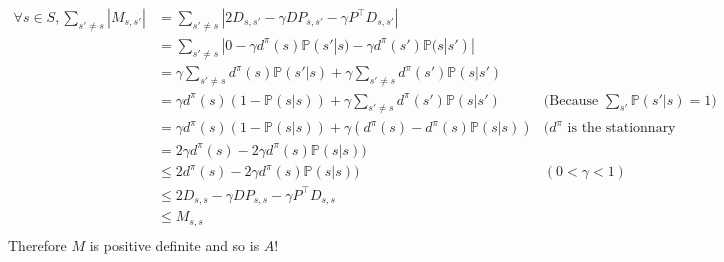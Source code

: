 \documentclass[a4paper]{article}
\newcommand{\transp}{\intercal}
\begin{document}
\begin{equation*}
    \begin{aligned}
        \forall s \in S, \sum_{s' \neq s} |M_{s, s'}| & = \sum_{s' \neq s} |2D_{s, s'} - \gamma DP_{s, s'} - \gamma P^\transp D_{s, s'}|                                                                             \\
                                                      & = \sum_{s' \neq s} |0 - \gamma d^\pi(s) \mathbb{P}(s'|s) - \gamma d^\pi(s') \mathbb{P}(s|s')|                                                                \\
                                                      & = \gamma \sum_{s' \neq s} d^\pi(s) \mathbb{P}(s'|s) + \gamma \sum_{s' \neq s} d^\pi(s') \mathbb{P}(s|s')                                                     \\
                                                      & = \gamma d^\pi(s) (1 - \mathbb{P}(s|s)) + \gamma \sum_{s' \neq s} d^\pi(s') \mathbb{P}(s|s')             & \text{(Because $\sum_{s'} \mathbb{P}(s'|s) = 1$)} \\
                                                      & = \gamma d^\pi(s) (1 - \mathbb{P}(s|s)) + \gamma (d^\pi(s) - d^\pi(s)\mathbb{P}(s|s))                    & \text{($d^\pi$ is the stationnary distribution)}  \\
                                                      & = 2\gamma d^\pi(s) - 2\gamma d^\pi(s)\mathbb{P}(s|s))                                                                                                        \\
                                                      & \le 2 d^\pi(s) - 2\gamma d^\pi(s)\mathbb{P}(s|s))                                                        & (0 < \gamma < 1)                                  \\
                                                      & \le 2 D_{s, s} - \gamma DP_{s, s} - \gamma P^\transp D_{s, s}                                                                                                \\
                                                      & \le M_{s, s}                                                                                                                                                 \\
    \end{aligned}
\end{equation*}
Therefore $M$ is positive definite and so is $A$!
\end{document}
